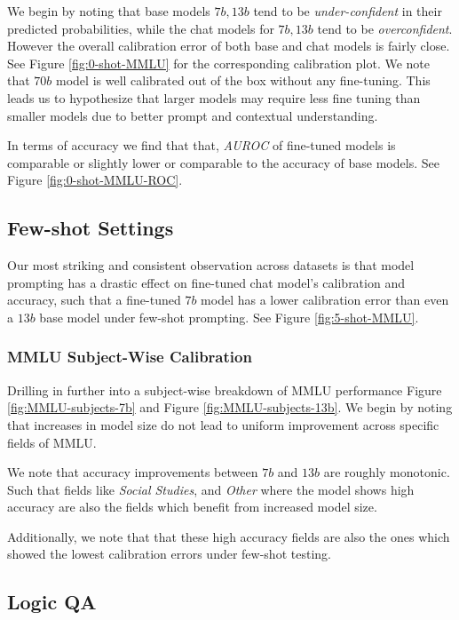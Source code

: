 \documentclass[11pt]{article}
\begin{document}
We begin by noting that base models $7b, 13b$ tend to be 
\emph{under-confident} in their predicted probabilities, while 
the chat models  for $7b, 13b$ tend to be  \emph{overconfident}.
However the overall calibration error of both base and chat
models is fairly close. See Figure \ref{fig:0-shot-MMLU}  for 
the corresponding calibration plot. We note that $70 b$ model is well 
calibrated out of the box without any fine-tuning. This leads us to 
hypothesize that larger models may require less fine tuning than smaller 
models due to better prompt and contextual understanding.

In terms of accuracy we find that that, \emph{AUROC} 
of fine-tuned models is comparable or slightly lower 
or comparable to the accuracy of base models. See 
Figure \ref{fig:0-shot-MMLU-ROC}.

\subsection{Few-shot Settings}

Our most striking and consistent observation across datasets 
is that model prompting has a drastic effect on fine-tuned chat 
model's calibration and accuracy, such that a fine-tuned $7 b$ 
model has a lower calibration error than even a $13 b$ base model 
under  few-shot prompting. See Figure \ref{fig:5-shot-MMLU}.

\subsubsection{MMLU Subject-Wise Calibration}

Drilling in further into a subject-wise breakdown of 
MMLU performance  Figure \ref{fig:MMLU-subjects-7b} and 
Figure \ref{fig:MMLU-subjects-13b}. We begin by noting that increases 
in model size do not lead to uniform improvement across specific 
fields of MMLU. 

We note that accuracy improvements between $7b$ and 
$13b$ are roughly monotonic. Such that fields like 
\emph{Social Studies}, and \emph{Other} where the model shows 
high accuracy are also the fields which benefit from increased 
model size.

Additionally, we note that that these high accuracy fields are 
also the ones which showed the lowest calibration errors under 
few-shot testing.

\subsection{Logic QA}
\end{document}
